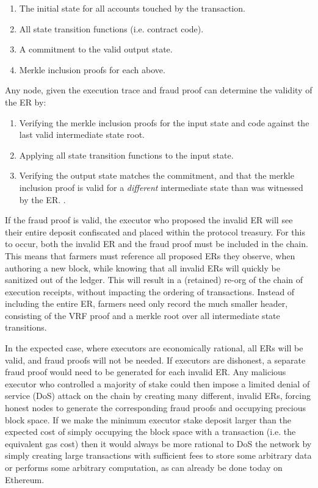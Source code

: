 \documentclass[conference]{IEEEtran}
\begin{document}
\begin{enumerate}
    \item The initial state for all accounts touched by the transaction.
    \item All state transition functions (i.e. contract code).
    \item A commitment to the valid output state.
    \item Merkle inclusion proofs for each above.
\end{enumerate}

Any node, given the execution trace and fraud proof can determine the validity of the ER by:

\begin{enumerate}
    \item Verifying the merkle inclusion proofs for the input state and code against the last valid intermediate state root.
    \item Applying all state transition functions to the input state.
    \item Verifying the output state matches the commitment, and that the merkle inclusion proof is valid for a \textit{different} intermediate state than was witnessed by the ER. .
\end{enumerate}

If the fraud proof is valid, the executor who proposed the invalid ER will see their entire deposit confiscated and placed within the protocol treasury. For this to occur, both the invalid ER and the fraud proof must be included in the chain. This means that farmers must reference all proposed ERs they observe, when authoring a new block, while knowing that all invalid ERs will quickly be sanitized out of the ledger. This will result in a (retained) re-org of the chain of execution receipts, without impacting the ordering of transactions. Instead of including the entire ER, farmers need only record the much smaller header, consisting of the VRF proof and a merkle root over all intermediate state transitions.

In the expected case, where executors are economically rational, all ERs will be valid, and fraud proofs will not be needed. If executors are dishonest, a separate fraud proof would need to be generated for each invalid ER. Any malicious executor who controlled a majority of stake could then impose a limited denial of service (DoS) attack on the chain by creating many different, invalid ERs, forcing honest nodes to generate the corresponding fraud proofs and occupying precious block space. If we make the minimum executor stake deposit larger than the expected cost of simply occupying the block space with a transaction (i.e. the equivalent gas cost) then it would always be more rational to DoS the network by simply creating large transactions with sufficient fees to store some arbitrary data or performs some arbitrary computation, as can already be done today on Ethereum. 
\end{document}
